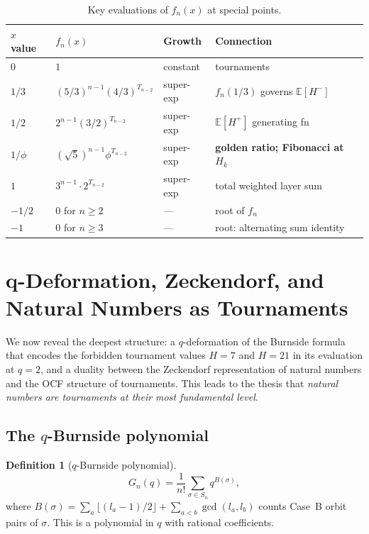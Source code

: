 \documentclass[12pt,reqno]{amsart}
\theoremstyle{definition}
\newtheorem{definition}[theorem]{Definition}
\theoremstyle{plain}
\begin{document}
\begin{table}[ht]
\centering
\caption{Key evaluations of $f_n(x)$ at special points.}
\small
\begin{tabular}{llll}
\toprule
$x$ value & $f_n(x)$ & Growth & Connection\\
\midrule
$0$ & $1$ & constant & tournaments\\
$1/3$ & $(5/3)^{n-1}(4/3)^{T_{n-2}}$ & super-exp & $f_n(1/3)$ governs $\mathbb{E}[H^-]$\\
$1/2$ & $2^{n-1}(3/2)^{T_{n-2}}$ & super-exp & $\mathbb{E}[H^+]$ generating fn\\
$1/\phi$ & $(\sqrt5)^{n-1}\phi^{T_{n-2}}$ & super-exp & \textbf{golden ratio; Fibonacci at $H_k$}\\
$1$ & $3^{n-1}\cdot 2^{T_{n-2}}$ & super-exp & total weighted layer sum\\
$-1/2$ & $0$ for $n\ge 2$ & — & root of $f_n$\\
$-1$ & $0$ for $n\ge 3$ & — & root: alternating sum identity\\
\bottomrule
\end{tabular}
\end{table}

\section{q-Deformation, Zeckendorf, and Natural Numbers as Tournaments}
\label{sec:zeckendorf}

We now reveal the deepest structure: a $q$-deformation of the Burnside formula
that encodes the forbidden tournament values $H=7$ and $H=21$ in its evaluation
at $q=2$, and a duality between the Zeckendorf representation of natural numbers
and the OCF structure of tournaments.  This leads to the thesis that
\emph{natural numbers are tournaments at their most fundamental level}.

\subsection{The \texorpdfstring{$q$}{q}-Burnside polynomial}
\label{ssec:q-burnside}

\begin{definition}[$q$-Burnside polynomial]
\[
  G_n(q)=\frac{1}{n!}\sum_{\sigma\in S_n}q^{B(\sigma)},
\]
where $B(\sigma)=\sum_a\lfloor(l_a-1)/2\rfloor+\sum_{a<b}\gcd(l_a,l_b)$
counts Case~B orbit pairs of $\sigma$.  This is a polynomial in $q$ with
rational coefficients.
\end{definition}
\end{document}
